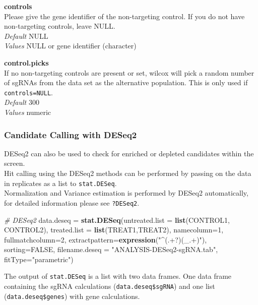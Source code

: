 \documentclass[]{article}
\newenvironment{Shaded}{\begin{snugshade}}{\end{snugshade}}
\newcommand{\KeywordTok}[1]{\textcolor[rgb]{0.13,0.29,0.53}{\textbf{{#1}}}}
\newcommand{\DataTypeTok}[1]{\textcolor[rgb]{0.13,0.29,0.53}{{#1}}}
\newcommand{\DecValTok}[1]{\textcolor[rgb]{0.00,0.00,0.81}{{#1}}}
\newcommand{\StringTok}[1]{\textcolor[rgb]{0.31,0.60,0.02}{{#1}}}
\newcommand{\CommentTok}[1]{\textcolor[rgb]{0.56,0.35,0.01}{\textit{{#1}}}}
\newcommand{\OtherTok}[1]{\textcolor[rgb]{0.56,0.35,0.01}{{#1}}}
\newcommand{\NormalTok}[1]{{#1}}
\begin{document}
\textbf{controls}\\
Please give the gene identifier of the non-targeting control. If you do
not have non-targeting controls, leave NULL.\\
\emph{Default} NULL\\
\emph{Values} NULL or gene identifier (character)

\textbf{control.picks}\\
If no non-targeting controls are present or set, wilcox will pick a
random number of sgRNAs from the data set as the alternative population.
This is only used if \texttt{controls=NULL}.\\
\emph{Default} 300\\
\emph{Values} numeric

\subsubsection{Candidate Calling with
DESeq2}\label{candidate-calling-with-deseq2}

DESeq2 can also be used to check for enriched or depleted candidates
within the screen.\\
Hit calling using the DESeq2 methods can be performed by passing on the
data in replicates as a list to \texttt{stat.DESeq}.\\
Normalization and Variance estimation is performed by DESeq2
automatically, for detailed information please see \texttt{?DESeq2}.

\begin{Shaded}
\begin{Highlighting}[]
\CommentTok{# DESeq2}
\NormalTok{data.deseq =}\StringTok{ }\KeywordTok{stat.DESeq}\NormalTok{(}\DataTypeTok{untreated.list =} \KeywordTok{list}\NormalTok{(CONTROL1, CONTROL2),}
  \DataTypeTok{treated.list =} \KeywordTok{list}\NormalTok{(TREAT1,TREAT2), }\DataTypeTok{namecolumn=}\DecValTok{1}\NormalTok{,}
  \DataTypeTok{fullmatchcolumn=}\DecValTok{2}\NormalTok{, }\DataTypeTok{extractpattern=}\KeywordTok{expression}\NormalTok{(}\StringTok{"^(.+?)(_.+)"}\NormalTok{),}
  \DataTypeTok{sorting=}\OtherTok{FALSE}\NormalTok{, }\DataTypeTok{filename.deseq =} \StringTok{"ANALYSIS-DESeq2-sgRNA.tab"}\NormalTok{,}
  \DataTypeTok{fitType=}\StringTok{"parametric"}\NormalTok{)}
\end{Highlighting}
\end{Shaded}

The output of \texttt{stat.DESeq} is a list with two data frames. One
data frame containing the sgRNA calculations
(\texttt{data.deseq\$sgRNA}) and one list (\texttt{data.deseq\$genes})
with gene calculations.
\end{document}
